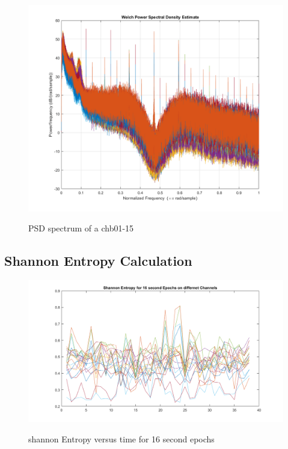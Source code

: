 \documentclass[11pt]{article}
\begin{document}
\begin{figure}[H]
    \begin{center}
        \includegraphics[scale=0.6]{Fig/PSDspect3.png}
        \label{fig:PSDspectrum2}
        \caption{PSD spectrum of a chb01-15}
    \end{center}
\end{figure}

\subsection{Shannon Entropy Calculation}
\begin{figure}[H]
    \begin{center}
        \includegraphics[scale=0.6]{Fig/Entropy.png}
        \label{fig:shannonEntropy}
        \caption{shannon Entropy versus time for 16 second epochs}
    \end{center}
\end{figure}
\end{document}
